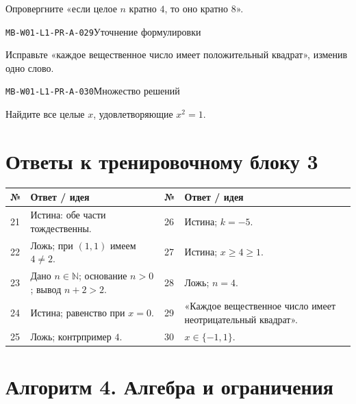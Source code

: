 \documentclass[11pt,a4paper,openany]{book}
\newcommand{\muid}[1]{\texttt{\footnotesize #1}}
\renewcommand{\arraystretch}{1.38}
\begin{document}
Опровергните «если целое $n$ кратно $4$, то оно кратно $8$».\par\medskip

\noindent\hypertarget{MB-W01-L1-PR-A-029}{}\muid{MB-W01-L1-PR-A-029}\quad Уточнение формулировки\par

Исправьте «каждое вещественное число имеет положительный квадрат», изменив одно слово.\par\medskip

\noindent\hypertarget{MB-W01-L1-PR-A-030}{}\muid{MB-W01-L1-PR-A-030}\quad Множество решений\par

Найдите все целые $x$, удовлетворяющие $x^2=1$.\par\medskip

\clearpage\section*{Ответы к тренировочному блоку 3}


\begingroup\footnotesize\renewcommand{\arraystretch}{1.45}

\begin{tabularx}{\textwidth}{@{}p{10mm}X p{10mm}X@{}}\toprule № & Ответ / идея & № & Ответ / идея\\\midrule

21 & Истина: обе части тождественны. & 26 & Истина; $k=-5$.\\

22 & Ложь; при $(1,1)$ имеем $4\ne2$. & 27 & Истина; $x\ge4\ge1$.\\

23 & Дано $n\in\mathbb N$; основание $n>0$; вывод $n+2>2$. & 28 & Ложь; $n=4$.\\

24 & Истина; равенство при $x=0$. & 29 & «Каждое вещественное число имеет неотрицательный квадрат».\\

25 & Ложь; контрпример $4$. & 30 & $x\in\{-1,1\}$.\\

\bottomrule\end{tabularx}\endgroup

\clearpage{}

\section*{Алгоритм 4. Алгебра и ограничения}
\end{document}
